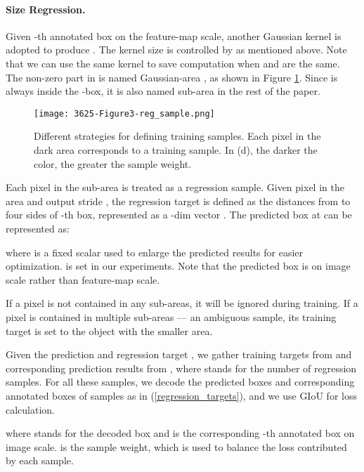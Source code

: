 \documentclass[letterpaper]{article} \usepackage{aaai20}  \usepackage{times}  \usepackage{helvet} \usepackage{courier}  \usepackage[hyphens]{url}  \usepackage{graphicx} \urlstyle{rm} \def\UrlFont{\rm}  \usepackage{graphicx}  \frenchspacing  \setlength{\pdfpagewidth}{8.5in}  \setlength{\pdfpageheight}{11in}  \usepackage{subcaption}
\begin{document}
\paragraph{Size Regression.} Given -th annotated box on the feature-map scale, another Gaussian kernel is adopted to produce . The kernel size is controlled by  as mentioned above. Note that we can use the same kernel to save computation when  and  are the same. The non-zero part in  is named Gaussian-area , as shown in Figure \ref{reg}. Since  is always inside the -box, it is also named sub-area in the rest of the paper. 


\begin{figure}[!t]
  \centering
  \texttt{[image: 3625-Figure3-reg\_sample.png]}
\caption{Different strategies for defining training samples. Each pixel in the dark area corresponds to a training sample. In (d), the darker the color, the greater the sample weight.}
  \label{reg}
\end{figure}


Each pixel in the sub-area is treated as a regression sample. Given pixel  in the area  and output stride , the regression target is defined as the distances from  to four sides of -th box, represented as a -dim vector . The predicted box at  can be represented as:



\noindent where  is a fixed scalar used to enlarge the predicted results for easier optimization.  is set in our experiments. Note that the predicted box  is on image scale rather than feature-map scale.

If a pixel is not contained in any sub-areas, it will be ignored during training. If a pixel is contained in multiple sub-areas --- an ambiguous sample, its training target is set to the object with the smaller area.

Given the prediction  and regression target , we gather training targets  from  and corresponding prediction results  from , where  stands for the number of regression samples. For all these samples, we decode the predicted boxes and corresponding annotated boxes of samples as in (\ref{regression_targets}), and we use GIoU \cite{rezatofighi2019generalized} for loss calculation.



\noindent where  stands for the decoded box  and  is the corresponding -th annotated box on image scale.  is the sample weight, which is used to balance the loss contributed by each sample.
\end{document}
